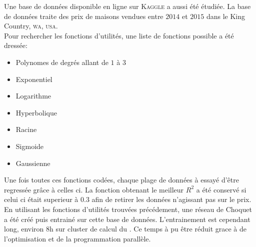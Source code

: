 Une base de données disponible en ligne sur \textsc{Kaggle} a aussi été étudiée\cite{kaggle}.
La base de données traite des prix de maisons vendues entre $2014$ et $2015$
dans le King Country, \textsc{wa}, \textsc{usa}.\\


Pour rechercher les fonctions d'utilités, une liste de fonctions possible a été dressée:
\begin{itemize}
    \item Polynomes de degrés allant de $1$ à $3$
    \item Exponentiel
    \item Logarithme
    \item Hyperbolique
    \item Racine
    \item Sigmoide
    \item Gaussienne
\end{itemize}
Une fois toutes ces fonctions codées, chaque plage de données à essayé d'être regressée grâce à celles ci.
La fonction obtenant le meilleur $R^2$ a été conservé si celui ci était superieur à $0.3$ afin de retirer
les données n'agissant pas sur le prix.\\


En utilisant les fonctions d'utilités trouvées précédement, une réseau de Choquet a été créé puis entrainé
sur cette base de données.
L'entrainement est cependant long, environ $8$h sur cluster de calcul du \lri.
Ce temps à pu être réduit grace à de l'optimisation et de la programmation parallèle.
